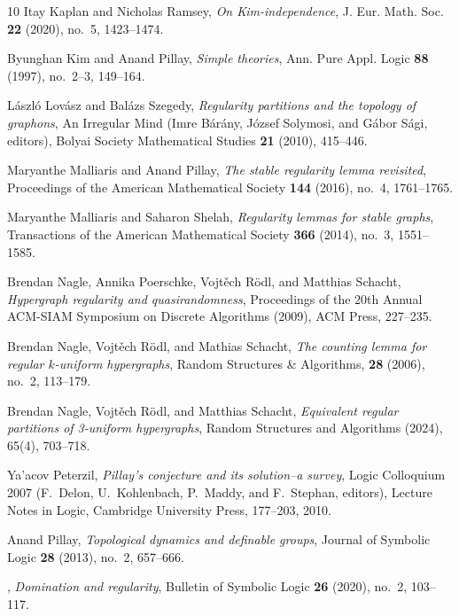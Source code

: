 \documentclass[12pt,oneside,british,a4wide]{amsart}
\numberwithin{equation}{section}
\theoremstyle{definition}
\begin{document}
\begin{thebibliography}{10}
 Itay Kaplan and Nicholas Ramsey, \emph{{On Kim-independence}},
J. Eur. Math. Soc. \textbf{22} (2020), no.~5,
  1423--1474.
  
Byunghan Kim and Anand Pillay, \emph{{Simple theories}},
Ann. Pure Appl. Logic \textbf{88} (1997), no.~2--3,
  149--164.

L\'{a}szl\'{o} Lov\'{a}sz and Bal\'{a}zs Szegedy,
\emph{Regularity partitions and the topology of graphons},
An Irregular Mind (Imre B\'ar\'any, J\'ozsef Solymosi, and G\'abor S\'agi, editors), Bolyai Society Mathematical Studies \textbf{21} (2010), 415--446.


Maryanthe Malliaris and Anand Pillay, \emph{{The stable regularity lemma revisited}}, Proceedings of the American Mathematical Society \textbf{144} (2016), no.~4, 1761--1765.

Maryanthe Malliaris and Saharon Shelah, \emph{{Regularity lemmas for stable
  graphs}}, Transactions of the American Mathematical Society \textbf{366}
  (2014), no.~3, 1551--1585.


Brendan Nagle, Annika Poerschke, Vojt\v{e}ch R\"odl, and Matthias
  Schacht, \emph{{Hypergraph regularity and quasirandomness}}, Proceedings of the 20th
Annual ACM-SIAM Symposium on Discrete Algorithms (2009), ACM Press, 227--235.  

Brendan Nagle, Vojt\v{e}ch R\"{o}dl,  and Mathias Schacht,
\emph{{The counting lemma for regular {$k$}-uniform hypergraphs}},
Random Structures \& Algorithms, \textbf{28} (2006), no.~2, 113--179.

Brendan Nagle, Vojt\v{e}ch R\"odl, and Matthias
  Schacht, \emph{{Equivalent regular partitions of 3-uniform hypergraphs}}, Random Structures and Algorithms (2024), 65(4), 703--718.  

Ya'acov Peterzil, \emph{{Pillay's conjecture and its solution--a survey}},
  Logic Colloquium 2007 (F.~Delon, U.~Kohlenbach, P.~Maddy, and F.~Stephan,
  editors), Lecture Notes in Logic, Cambridge University Press,
  177--203, 2010.
  
  
Anand Pillay, \emph{{Topological dynamics and definable groups}}, Journal of
  Symbolic Logic \textbf{28} (2013), no.~2, 657--666.
  
\bysame, \emph{{Domination and regularity}}, Bulletin of
  Symbolic Logic \textbf{26} (2020), no.~2, 103--117.
  

\end{thebibliography}
\end{document}
